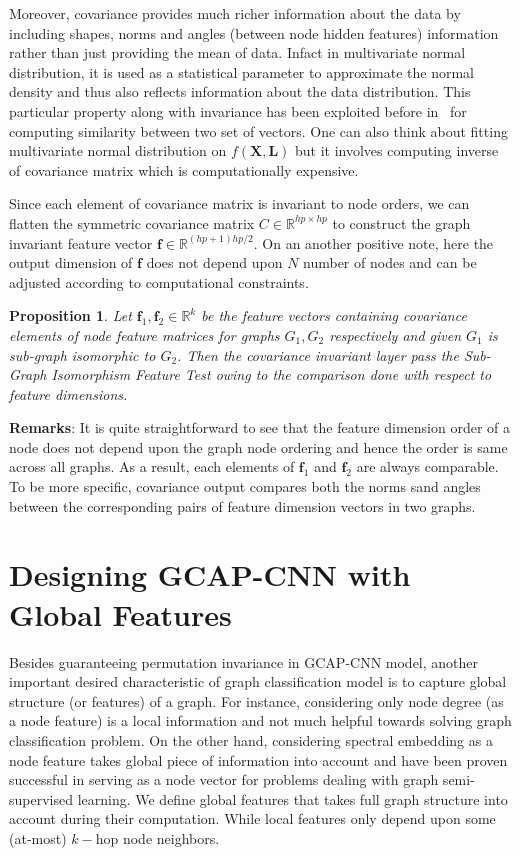 \documentclass{article}
\newtheorem{prop}{Proposition}
\begin{document}
Moreover, covariance provides much richer information about the data by including  shapes,  norms and angles (between node hidden features) information rather  than just providing the mean of  data. Infact in multivariate normal distribution, it is  used as a  statistical parameter to approximate the normal density and thus also reflects information about the data distribution. This particular property along with invariance has   been exploited before in~\cite{kondor2003kernel} for computing similarity between two set of vectors. One can also think about   fitting multivariate normal distribution on $f(\mathbf{X}, \mathbf{L})$   but it involves computing inverse of  covariance matrix which is  computationally expensive. 
 
Since each element of covariance matrix is invariant to node orders, we can flatten the symmetric covariance matrix $C\in \mathbb{R}^{hp \times hp}$ to construct the graph invariant feature vector $\mathbf{f} \in \mathbb{R}^{(hp+1)hp/2} $. On an  another positive note, here the output dimension of $\mathbf{f}$ does not depend upon $N$ number of nodes and can be adjusted according to computational constraints.

\begin{prop}\label{prop:cov-isomorphic-test} 
Let $\mathbf{f}_1,  \mathbf{f}_2\in \mathbb{R}^k$ be the feature vectors containing covariance elements of  node feature matrices for graphs $G_1, G_2$ respectively and given $G_1$ is sub-graph isomorphic to $G_2$. Then the covariance invariant layer \emph{pass} the Sub-Graph Isomorphism Feature Test  owing to the comparison done with respect to feature dimensions.
\end{prop}
\noindent\textbf{{Remarks}}: It is quite straightforward to see that the feature dimension order of a node  does not depend upon the graph node ordering and hence   the order is same across all    graphs. As a result, each elements of $\mathbf{f}_1$ and $\mathbf{f}_2$ are always comparable. To be more specific, covariance output compares both the norms sand angles between the corresponding pairs of feature dimension vectors in two graphs.



\section{Designing GCAP-CNN with Global Features}\label{sec:global_features}

Besides guaranteeing permutation invariance in GCAP-CNN model, another important desired characteristic of  graph classification model is to capture global structure (or features) of a graph.  For instance, considering only node degree (as a node feature) is a local  information and not much helpful towards solving graph classification problem. On the other hand, considering spectral embedding as a node feature  takes global  piece of information into account and have been proven successful  in serving as a node vector for problems dealing with graph semi-supervised learning.  
We define global features that takes full graph structure into account during   their computation. While local features only depend upon some (at-most) $k-$hop node  neighbors.
\end{document}
